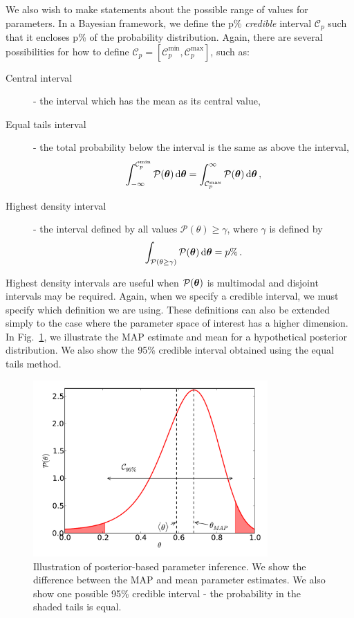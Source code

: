 We also wish to make statements about the possible range of values for parameters. In a Bayesian framework, we define the p\% \textit{credible} interval $\mathcal{C}_{p}$ such that it encloses p\% of the probability distribution. Again, there are several possibilities for how to define $\mathcal{C}_{p} = [\mathcal{C}_{p}^\textrm{min}, \mathcal{C}_{p}^\textrm{max}]$, such as:
\begin{description}
\item[Central interval] - the interval which has the mean as its central value,
\item[Equal tails interval] - the total probability below the interval is the same as above the interval,
\begin{equation}
\int_{-\infty}^{\mathcal{C}_{p}^\textrm{min}} \mathcal{P}(\boldsymbol\theta) \, \mathrm{d}\boldsymbol\theta = \int_{\mathcal{C}_{p}^\textrm{max}}^{\infty} \mathcal{P}(\boldsymbol\theta) \, \mathrm{d}\boldsymbol\theta\,,
\end{equation}
\item[Highest density interval] - the interval defined by all values $\mathcal{P}(\theta) \geq \gamma$, where $\gamma$ is defined by
\begin{equation}
\int_{\mathcal{P}(\theta \geq \gamma)} \mathcal{P}(\boldsymbol\theta) \, \mathrm{d}\boldsymbol\theta = p\%\,.
\end{equation}
\end{description}
Highest density intervals are useful when $\mathcal{P}(\boldsymbol\theta)$ is multimodal and disjoint intervals may be required. Again, when we specify a credible interval, we must specify which definition we are using. These definitions can also be extended simply to the case where the parameter space of interest has a higher dimension. In Fig.~\ref{fig:parameter:PDF}, we illustrate the MAP estimate and mean for a hypothetical posterior distribution. We also show the 95\% credible interval obtained using the equal tails method.

\begin{figure}[t]
\centering
  \includegraphics[width=0.8\textwidth]{ParamRecon/PDF.pdf}
  \caption[Posterior-based parameter inference]{Illustration of posterior-based parameter inference. We show the difference between the MAP and mean parameter estimates. We also show one possible 95\% credible interval - the probability in the shaded tails is equal.}
  \label{fig:parameter:PDF}
\end{figure}



